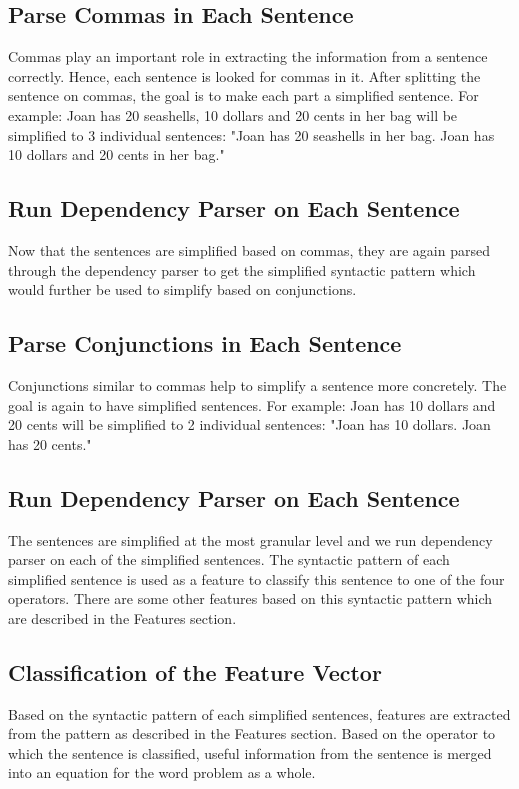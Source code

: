 \documentclass[11pt]{article}
\begin{document}
\subsection{Parse Commas in Each Sentence}
Commas play an important role in extracting the information from a sentence correctly. Hence, each sentence is looked for commas in it. After splitting the sentence on commas, the goal is to make each part a simplified sentence. For example: Joan has 20 seashells, 10 dollars and 20 cents in her bag will be simplified to 3 individual sentences: "Joan has 20 seashells in her bag. Joan has 10 dollars and 20 cents in her bag."

\subsection{Run Dependency Parser on Each Sentence}
Now that the sentences are simplified based on commas, they are again parsed through the dependency parser to get the simplified syntactic pattern which would further be used to simplify based on conjunctions.

\subsection{Parse Conjunctions in Each Sentence}
Conjunctions similar to commas help to simplify a sentence more concretely. The goal is again to have simplified sentences. For example: Joan has 10 dollars and 20 cents will be simplified to 2 individual sentences: "Joan has 10 dollars. Joan has 20 cents."

\subsection{Run Dependency Parser on Each Sentence}
The sentences are simplified at the most granular level and we run dependency parser on each of the simplified sentences. The syntactic pattern of each simplified sentence is used as a feature to classify this sentence to one of the four operators. There are some other features based on this syntactic pattern which are described in the Features section.

\subsection{Classification of the Feature Vector}
Based on the syntactic pattern of each simplified sentences, features are extracted from the pattern as described in the Features section. Based on the operator to which the sentence is classified, useful information from the sentence is merged into an equation for the word problem as a whole. 
\end{document}

